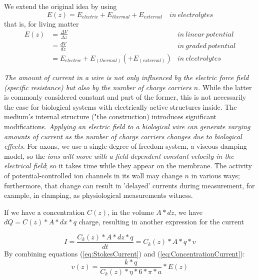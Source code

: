 \ifx\magyar\undefined
We extend the original idea by using
\[
E(z)  = E_{electric} + E_{thermal} + E_{external}\quad in\ electrolytes
\]
that is, for living matter
\begin{align}
	E(z) & = \frac{\Delta V}{\Delta z} & in\ linear\ potential\\
	& = \frac{dV}{dz} & in\ graded\ potential\\
	& = E_{electric} + E_{(thermal)}  (+ E_{(external)}) & in\ electrolytes
\end{align}

\textit{The amount of current in a wire is not only influenced by the electric
	force field (specific resistance) but also by the number of charge
	carriers $n$.} While the latter is commonly considered constant and
part of the former, this is not necessarily the case for biological
systems with electrically active structures inside. The medium's internal
structure ("the construction) introduces significant modifications. \textit{Applying an electric
	field to a biological wire can generate varying amounts of current as the number
	of charge carriers changes due to biological effects.} For axons, we use a single-degree-of-freedom
system, a viscous damping model, so the \textit{ions will move with
	a field-dependent constant velocity in the electrical field}; so it takes time while they appear on the membrane.
The activity of potential-controlled ion channels in its wall may
change $n$ in various ways; furthermore, that change can result in
'delayed' currents during measurement, for example, in clamping, as physiological measurements witness.
\else

\fi


\ifx\magyar\undefined
If we have a concentration
$C(z)$, in the volume $A*dz$, we have $dQ=C(z)*A*dx*q$
charge, resulting in another expression for the current

\begin{equation}
	I=\frac{C_k(z)*A*dz*q}{dt}=C_k(z)*A*q*v\label{eq:ConcentrationCurrent}
\end{equation}
By combining equations (\ref{eq:StokesCurrent}) and (\ref{eq:ConcentrationCurrent}): 
\hypertarget{eq:StokesLawSpeed}{ }
\begin{equation}
	v(z)=\frac{k*q}{C_k(z)*\eta*6*\pi*a}*E(z)\label{eq:StokesSpeed}
\end{equation}

